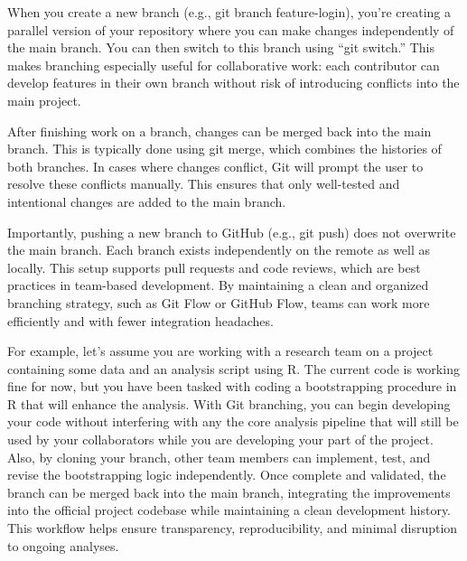 When you create a new branch (e.g., git branch feature-login), you're creating a parallel version of your repository where you can make changes independently of the main branch. You can then switch to this branch using ``git switch.'' This makes branching especially useful for collaborative work: each contributor can develop features in their own branch without risk of introducing conflicts into the main project.

After finishing work on a branch, changes can be merged back into the main branch. This is typically done using git merge, which combines the histories of both branches. In cases where changes conflict, Git will prompt the user to resolve these conflicts manually. This ensures that only well-tested and intentional changes are added to the main branch.

Importantly, pushing a new branch to GitHub (e.g., git push) does not overwrite the main branch. Each branch exists independently on the remote as well as locally. This setup supports pull requests and code reviews, which are best practices in team-based development. By maintaining a clean and organized branching strategy, such as Git Flow or GitHub Flow, teams can work more efficiently and with fewer integration headaches.

For example, let's assume you are working with a research team on a project containing some data and an analysis script using R. The current code is working fine for now, but you have been tasked with coding a bootstrapping procedure in R that will enhance the analysis. With Git branching, you can begin developing your code without interfering with any the core analysis pipeline that will still be used by your collaborators while you are developing your part of the project. Also, by cloning your branch, other team members can implement, test, and revise the bootstrapping logic independently. Once complete and validated, the branch can be merged back into the main branch, integrating the improvements into the official project codebase while maintaining a clean development history. This workflow helps ensure transparency, reproducibility, and minimal disruption to ongoing analyses.

